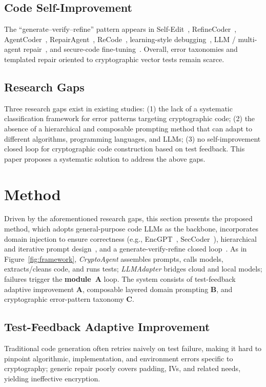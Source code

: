 \documentclass[runningheads]{llncs}
\begin{document}
\subsection{Code Self-Improvement}
The ``generate--verify--refine'' pattern appears in Self-Edit~\cite{selfedit}, RefineCoder~\cite{refinecoder}, AgentCoder~\cite{agentcoder}, RepairAgent~\cite{repairagent}, ReCode~\cite{recode}, learning-style debugging~\cite{cycle,rlef}, LLM / multi-agent repair~\cite{ledex,li2023,rgd,unidebugger,tang2024}, and secure-code fine-tuning~\cite{secsurvey,securecodegen}. Overall, error taxonomies and templated repair oriented to cryptographic vector tests remain scarce.

\subsection{Research Gaps}
\label{subsec:research_gaps}
Three research gaps exist in existing studies: (1) the lack of a systematic classification framework for error patterns targeting cryptographic code; (2) the absence of a hierarchical and composable prompting method that can adapt to different algorithms, programming languages, and LLMs; (3) no self-improvement closed loop for cryptographic code construction based on test feedback. This paper proposes a systematic solution to address the above gaps.

\section{Method}
\label{sec:method}
Driven by the aforementioned research gaps, this section presents the proposed method, which adopts general-purpose code LLMs as the backbone, incorporates domain injection to ensure correctness (e.g., EncGPT~\cite{encgpt}, SecCoder~\cite{seccoder}), hierarchical and iterative prompt design~\cite{hierprompt,selfrefine}, and a generate-verify-refine closed loop~\cite{selfedit,refinecoder,agentcoder}. As in Figure~\ref{fig:framework}, \emph{CryptoAgent} assembles prompts, calls models, extracts/cleans code, and runs tests; \emph{LLMAdapter} bridges cloud and local models; failures trigger the \textbf{module~A} loop. The system consists of test-feedback adaptive improvement \textbf{A}, composable layered domain prompting \textbf{B}, and cryptographic error-pattern taxonomy \textbf{C}.


\subsection{Test-Feedback Adaptive Improvement}
Traditional code generation often retries naively on test failure, making it hard to pinpoint algorithmic, implementation, and environment errors specific to cryptography; generic repair poorly covers padding, IVs, and related needs, yielding ineffective encryption.
\end{document}
